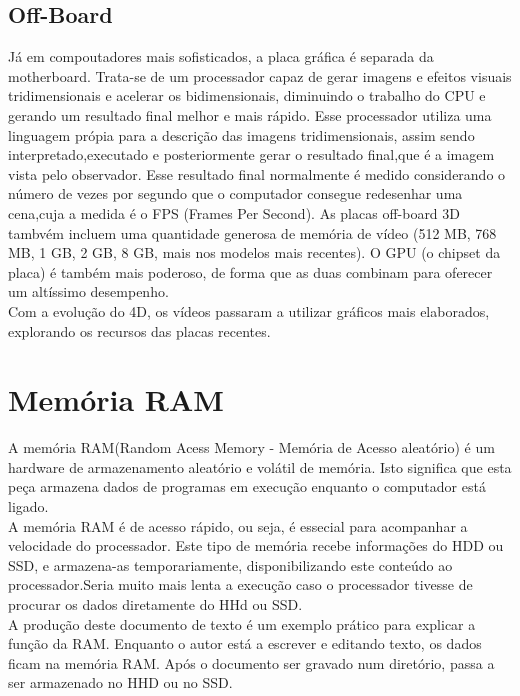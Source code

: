 \section{Off-Board}
  Já em compoutadores mais sofisticados, a placa gráfica é separada da motherboard. Trata-se de um processador capaz de gerar imagens e efeitos visuais tridimensionais e acelerar os bidimensionais, diminuindo o trabalho do CPU e gerando um resultado final melhor e mais rápido. Esse processador utiliza uma linguagem própia para a descrição das imagens tridimensionais, assim sendo interpretado,executado e posteriormente gerar o resultado final,que é a imagem vista pelo observador. Esse resultado final normalmente é medido considerando o número de vezes por segundo que o computador consegue redesenhar uma cena,cuja a medida é o FPS (Frames Per Second).
  As placas off-board 3D tambvém incluem uma quantidade generosa de memória de vídeo (512 MB, 768 MB, 1 GB, 2 GB, 8 GB, mais nos modelos mais recentes). O GPU (o chipset da placa) é também mais poderoso, de forma que as duas combinam para oferecer um altíssimo desempenho.\\
  Com a evolução do 4D, os vídeos passaram a utilizar gráficos mais elaborados, explorando os recursos das placas recentes.  









\chapter{Memória RAM}
\label{chap.ram}
A memória RAM(Random Acess Memory - Memória de Acesso aleatório) é um hardware de armazenamento aleatório e volátil de memória. Isto significa que esta peça armazena dados de programas em execução enquanto o computador está ligado.\\
A memória RAM é de acesso rápido, ou seja, é essecial para acompanhar a velocidade do processador. Este tipo de memória recebe informações do HDD ou SSD, e armazena-as temporariamente, disponibilizando este conteúdo ao processador.Seria muito mais lenta a execução caso o processador tivesse de procurar os dados diretamente do HHd ou SSD.\\
A produção deste documento de texto é um exemplo prático para explicar a função da RAM. Enquanto o autor está a escrever e editando texto, os dados ficam na memória RAM. Após o documento ser gravado num diretório, passa a ser armazenado no HHD ou no SSD.  

